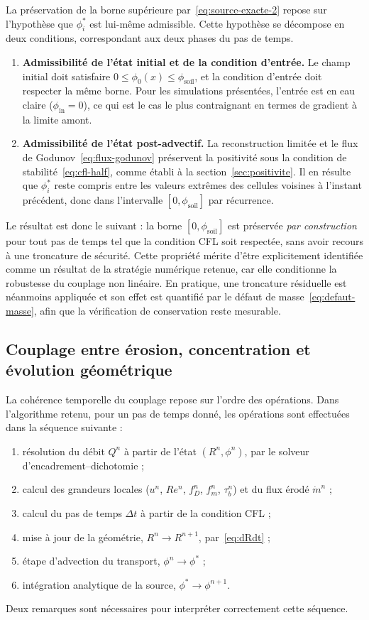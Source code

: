 \documentclass[11pt,a4paper]{report}
\newcommand{\phisol}{\phi_{\mathrm{soil}}}
\newcommand{\mdot}{\dot{m}}
\newcommand{\dt}{\Delta t}
\begin{document}
La préservation de la borne supérieure par~\eqref{eq:source-exacte-2} repose sur l'hypothèse que
\(\phi_i^*\) est lui-même admissible. Cette hypothèse se décompose en deux conditions, correspondant aux
deux phases du pas de temps.
\begin{enumerate}
  \item \textbf{Admissibilité de l'état initial et de la condition d'entrée.} Le champ initial doit
        satisfaire \(0\le\phi_0(x)\le\phisol\), et la condition d'entrée doit respecter la même borne.
        Pour les simulations présentées, l'entrée est en eau claire (\(\phi_{\mathrm{in}} = 0\)), ce qui
        est le cas le plus contraignant en termes de gradient à la limite amont.
  \item \textbf{Admissibilité de l'état post-advectif.} La reconstruction limitée et le flux de
        Godunov~\eqref{eq:flux-godunov} préservent la positivité sous la condition de
        stabilité~\eqref{eq:cfl-half}, comme établi à la section~\ref{sec:positivite}. Il en résulte que
        \(\phi_i^*\) reste compris entre les valeurs extrêmes des cellules voisines à l'instant
        précédent, donc dans l'intervalle \([0,\phisol]\) par récurrence.
\end{enumerate}
Le résultat est donc le suivant : la borne \([0,\phisol]\) est préservée \emph{par construction} pour tout
pas de temps tel que la condition CFL soit respectée, sans avoir recours à une troncature de sécurité.
Cette propriété mérite d'être explicitement identifiée comme un résultat de la stratégie numérique
retenue, car elle conditionne la robustesse du couplage non linéaire. En pratique, une troncature
résiduelle est néanmoins appliquée et son effet est quantifié par le défaut de
masse~\eqref{eq:defaut-masse}, afin que la vérification de conservation reste mesurable.

\subsection{Couplage entre érosion, concentration et évolution géométrique}

La cohérence temporelle du couplage repose sur l'ordre des opérations. Dans l'algorithme retenu, pour un
pas de temps donné, les opérations sont effectuées dans la séquence suivante :
\begin{enumerate}[label=(\roman*)]
  \item résolution du débit \(Q^n\) à partir de l'état \((R^n,\phi^n)\), par le solveur
        d'encadrement--dichotomie ;
  \item calcul des grandeurs locales (\(u^n\), \(Re^n\), \(f_D^n\), \(f_m^n\), \(\tau_b^n\)) et du flux
        érodé \(\mdot^n\) ;
  \item calcul du pas de temps \(\dt\) à partir de la condition CFL ;
  \item mise à jour de la géométrie, \(R^n \to R^{n+1}\), par~\eqref{eq:dRdt} ;
  \item étape d'advection du transport, \(\phi^n \to \phi^*\) ;
  \item intégration analytique de la source, \(\phi^* \to \phi^{n+1}\).
\end{enumerate}
Deux remarques sont nécessaires pour interpréter correctement cette séquence.
\end{document}
